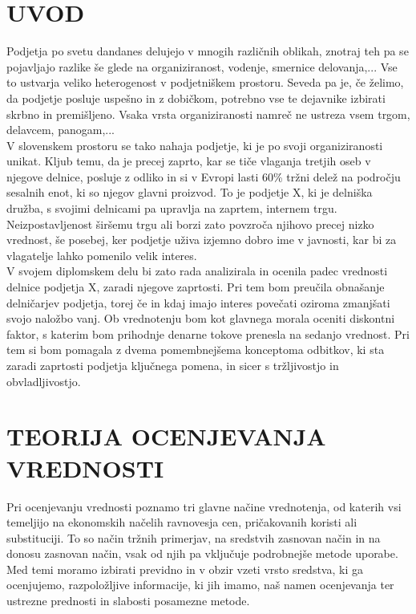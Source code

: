 \documentclass[12pt,a4paper]{amsart}
\theoremstyle{definition} %
\theoremstyle{plain} %
\begin{document}
\section{\textbf{UVOD}}
Podjetja po svetu dandanes delujejo v mnogih različnih oblikah, znotraj teh pa se pojavljajo razlike še glede na organiziranost, vodenje, smernice delovanja,... Vse to ustvarja veliko heterogenost v podjetniškem prostoru. Seveda pa je, če želimo, da podjetje posluje uspešno in z dobičkom, potrebno vse te dejavnike izbirati skrbno in premišljeno. Vsaka vrsta organiziranosti namreč ne ustreza vsem trgom, delavcem, panogam,... \\
V slovenskem prostoru se tako nahaja podjetje, ki je po svoji organiziranosti unikat. Kljub temu, da je precej zaprto, kar se tiče vlaganja tretjih oseb v njegove delnice, posluje z odliko in si v Evropi lasti 60\% tržni delež na področju sesalnih enot, ki so njegov glavni proizvod. To je podjetje X, ki je delniška družba, s svojimi delnicami pa upravlja na zaprtem, internem trgu. Neizpostavljenost širšemu trgu ali borzi zato povzroča njihovo precej nizko vrednost, še posebej, ker podjetje uživa izjemno dobro ime v javnosti, kar bi za vlagatelje lahko pomenilo velik interes.\\
V svojem diplomskem delu bi zato rada analizirala in ocenila padec vrednosti delnice podjetja X, zaradi njegove zaprtosti. Pri tem bom preučila obnašanje delničarjev podjetja, torej če in kdaj imajo interes povečati oziroma zmanjšati svojo naložbo vanj. Ob vrednotenju bom kot glavnega morala oceniti diskontni faktor, s katerim bom prihodnje denarne tokove prenesla na sedanjo vrednost. Pri tem si bom pomagala z dvema pomembnejšema konceptoma odbitkov, ki sta zaradi zaprtosti podjetja ključnega pomena, in sicer s tržljivostjo in obvladljivostjo.
\newpage







\section{\textbf{TEORIJA OCENJEVANJA VREDNOSTI}}

Pri ocenjevanju vrednosti poznamo tri glavne načine vrednotenja, od katerih vsi temeljijo na ekonomskih načelih ravnovesja cen, pričakovanih koristi ali substituciji. To so način tržnih primerjav, na sredstvih zasnovan način in na donosu zasnovan način, vsak od njih pa vključuje podrobnejše metode uporabe. Med temi moramo izbirati previdno in v obzir vzeti vrsto sredstva, ki ga ocenjujemo, razpoložljive informacije, ki jih imamo, naš namen ocenjevanja ter ustrezne prednosti in slabosti posamezne metode. 
\end{document}
